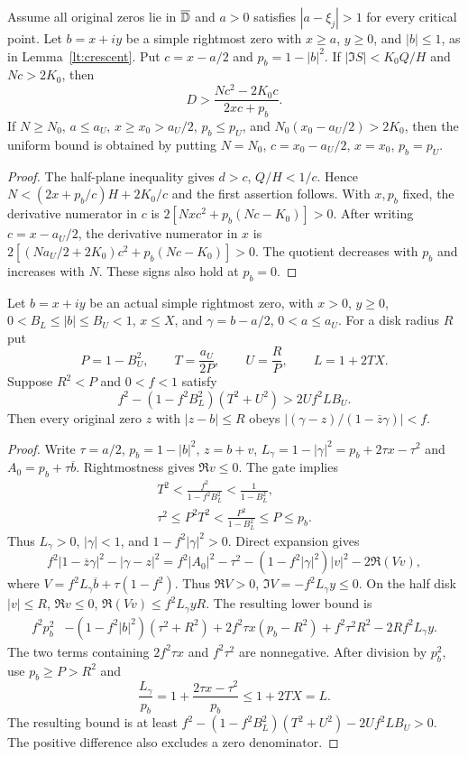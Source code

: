 \begin{lemma}\label{lt:same-gap-field}
Assume all original zeros lie in $\overline{\mathbb D}$ and $a>0$ satisfies
$|a-\xi_j|>1$ for every critical point. Let $b=x+iy$ be a simple
rightmost zero with $x\ge a$, $y\ge0$, and $|b|\le1$, as in
Lemma~\ref{lt:crescent}. Put $c=x-a/2$ and $p_b=1-|b|^2$.
If $|\Im S|<K_0Q/H$ and $Nc>2K_0$, then
\[
 D>\frac{Nc^2-2K_0c}{2xc+p_b}.
\]
If $N\ge N_0$, $a\le a_U$, $x\ge x_0>a_U/2$, $p_b\le p_U$, and
$N_0(x_0-a_U/2)>2K_0$, then the uniform bound is obtained by
putting $N=N_0$, $c=x_0-a_U/2$, $x=x_0$, $p_b=p_U$.
\end{lemma}
\begin{proof}
The half-plane inequality gives $d>c$, $Q/H<1/c$. Hence
$N<(2x+p_b/c)H+2K_0/c$ and the first assertion follows.
With $x,p_b$ fixed, the derivative numerator in $c$ is
$2[Nxc^2+p_b(Nc-K_0)]>0$.
After writing $c=x-a_U/2$, the derivative numerator in $x$ is
$2[(Na_U/2+2K_0)c^2+p_b(Nc-K_0)]>0$.
The quotient decreases with $p_b$ and increases with $N$.
These signs also hold at $p_b=0$.
\end{proof}

\begin{lemma}\label{lt:half-disk-factor}
Let $b=x+iy$ be an actual simple rightmost zero, with
$x>0$, $y\ge0$, $0<B_L\le|b|\le B_U<1$,
$x\le X$, and $\gamma=b-a/2$, $0<a\le a_U$.
For a disk radius $R$ put
\[
 P=1-B_U^2,\qquad T=\frac{a_U}{2P},\qquad U=\frac RP,\qquad
 L=1+2TX.
\]
Suppose $R^2<P$ and $0<f<1$ satisfy
\begin{equation}\label{lt:half-disk-gate}
 f^2-(1-f^2B_L^2)(T^2+U^2)>2Uf^2LB_U.
\end{equation}
Then every original zero $z$ with $|z-b|\le R$ obeys
$|(\gamma-z)/(1-\overline z\gamma)|<f$.
\end{lemma}
\begin{proof}
Write $\tau=a/2$, $p_b=1-|b|^2$, $z=b+v$,
$L_\gamma=1-|\gamma|^2=p_b+2\tau x-\tau^2$ and
$A_0=p_b+\tau\overline b$. Rightmostness gives $\Re v\le0$.
The gate implies
\begin{gather*}
 T^2<\frac{f^2}{1-f^2B_L^2}<\frac1{1-B_L^2},\\
 \tau^2\le P^2T^2<\frac{P^2}{1-B_L^2}\le P\le p_b.
\end{gather*}
Thus $L_\gamma>0$, $|\gamma|<1$, and $1-f^2|\gamma|^2>0$.
Direct expansion gives
\[
 f^2|1-\overline z\gamma|^2-|\gamma-z|^2
 =f^2|A_0|^2-\tau^2-(1-f^2|\gamma|^2)|v|^2-2\Re(Vv),
\]
where $V=f^2L_\gamma\overline b+\tau(1-f^2)$.
Thus $\Re V>0$, $\Im V=-f^2L_\gamma y\le0$.
On the half disk $|v|\le R$, $\Re v\le0$,
$\Re(Vv)\le f^2L_\gamma yR$. The resulting lower bound is
\begin{align*}
 f^2p_b^2&-(1-f^2|b|^2)(\tau^2+R^2)
 +2f^2\tau x(p_b-R^2)+f^2\tau^2R^2-2Rf^2L_\gamma y.
\end{align*}
The two terms containing $2f^2\tau x$ and $f^2\tau^2$ are nonnegative.
After division by $p_b^2$, use $p_b\ge P>R^2$ and
\[
 \frac{L_\gamma}{p_b}
 =1+\frac{2\tau x-\tau^2}{p_b}\le1+2TX=L.
\]
The resulting bound is at least
$f^2-(1-f^2B_L^2)(T^2+U^2)-2Uf^2LB_U>0$.
The positive difference also excludes a zero denominator.
\end{proof}

